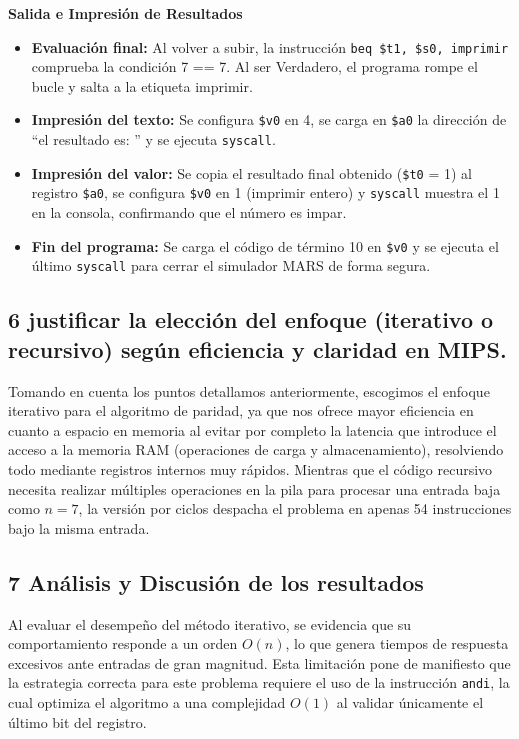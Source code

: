 \documentclass[12pt,a4paper]{article}
\begin{document}
\textbf{Salida e Impresión de Resultados}
\begin{itemize}
    \item \textbf{Evaluación final:} Al volver a subir, la instrucción \texttt{beq \$t1, \$s0, imprimir} comprueba la condición 7 == 7. Al ser Verdadero, el programa rompe el bucle y salta a la etiqueta imprimir.
    \item \textbf{Impresión del texto:} Se configura \texttt{\$v0} en 4, se carga en \texttt{\$a0} la dirección de ``el resultado es: '' y se ejecuta \texttt{syscall}.
    \item \textbf{Impresión del valor:} Se copia el resultado final obtenido (\texttt{\$t0} = 1) al registro \texttt{\$a0}, se configura \texttt{\$v0} en 1 (imprimir entero) y \texttt{syscall} muestra el 1 en la consola, confirmando que el número es impar.
    \item \textbf{Fin del programa:} Se carga el código de término 10 en \texttt{\$v0} y se ejecuta el último \texttt{syscall} para cerrar el simulador MARS de forma segura.
\end{itemize}

\subsection*{6 justificar la elección del enfoque (iterativo o recursivo) según eficiencia y claridad en MIPS.}
Tomando en cuenta los puntos detallamos anteriormente, escogimos el enfoque iterativo para el algoritmo de paridad, ya que nos ofrece mayor eficiencia en cuanto a espacio en memoria al evitar por completo la latencia que introduce el acceso a la memoria RAM (operaciones de carga y almacenamiento), resolviendo todo mediante registros internos muy rápidos. Mientras que el código recursivo necesita realizar múltiples operaciones en la pila para procesar una entrada baja como $n=7$, la versión por ciclos despacha el problema en apenas 54 instrucciones bajo la misma entrada.

\subsection*{7 Análisis y Discusión de los resultados}
Al evaluar el desempeño del método iterativo, se evidencia que su comportamiento responde a un orden $O(n)$, lo que genera tiempos de respuesta excesivos ante entradas de gran magnitud. Esta limitación pone de manifiesto que la estrategia correcta para este problema requiere el uso de la instrucción \texttt{andi}, la cual optimiza el algoritmo a una complejidad $O(1)$ al validar únicamente el último bit del registro.
\end{document}
